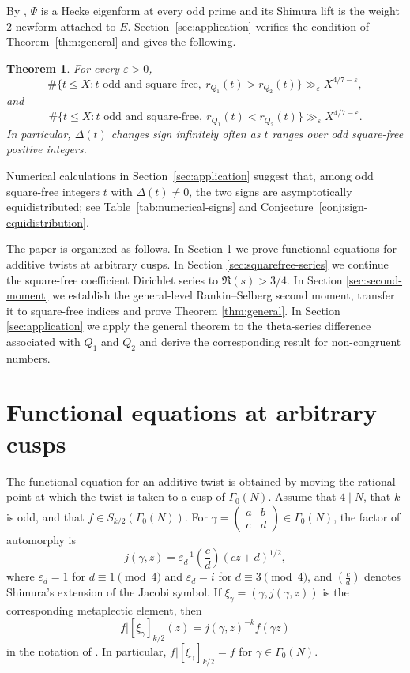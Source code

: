 \documentclass[10pt,a4paper]{amsart}
\newtheorem{theorem}{Theorem}[section]
\begin{document}
By \cite{Qin}, $\Psi$ is a Hecke eigenform at every odd prime and its
Shimura lift is the weight $2$ newform attached to $E$.
Section~\ref{sec:application} verifies the condition of Theorem~\ref{thm:general} and gives the following.

\begin{theorem}\label{thm:quadratic}
For every $\varepsilon>0$,
\[
\#\{t\le X:t\text{ odd and square-free},\ r_{Q_1}(t)>r_{Q_2}(t)\}
\gg_\varepsilon X^{4/7-\varepsilon},
\]
and
\[
\#\{t\le X:t\text{ odd and square-free},\ r_{Q_1}(t)<r_{Q_2}(t)\}
\gg_\varepsilon X^{4/7-\varepsilon}.
\]
In particular, $\Delta(t)$ changes sign infinitely often as $t$ ranges over
odd square-free positive integers.
\end{theorem}

Numerical calculations in Section~\ref{sec:application} suggest that,
among odd square-free integers $t$ with $\Delta(t)\ne0$, the two signs are
asymptotically equidistributed; see Table~\ref{tab:numerical-signs} and
Conjecture~\ref{conj:sign-equidistribution}.

The paper is organized as follows. In Section \ref{sec:functional} we prove functional equations for additive twists at arbitrary cusps. In Section \ref{sec:squarefree-series} we continue the square-free coefficient Dirichlet series to $\Re(s)>3/4$. In Section \ref{sec:second-moment} we establish the general-level Rankin--Selberg second moment, transfer it to square-free indices and prove Theorem \ref{thm:general}. In Section \ref{sec:application} we apply the general theorem to the theta-series difference associated with $Q_1$ and $Q_2$ and derive the corresponding result for non-congruent numbers.

\section{Functional equations at arbitrary cusps}\label{sec:functional}
The functional equation for an additive twist is obtained by moving the
rational point at which the twist is taken to a cusp of $\Gamma_0(N)$.
 Assume that
$4\mid N$, that $k$ is odd, and that $f\in S_{k/2}(\Gamma_0(N))$. For
$\gamma=\begin{pmatrix}a&b\\c&d\end{pmatrix}\in\Gamma_0(N)$, the factor of
automorphy is
\[
j(\gamma,z)=\varepsilon_d^{-1}\left(\frac cd\right)(cz+d)^{1/2},
\]
where $\varepsilon_d=1$ for $d\equiv1\pmod4$ and $\varepsilon_d=i$ for
$d\equiv3\pmod4$, and $\left(\frac cd\right)$ denotes Shimura's extension
of the Jacobi symbol. If $\xi_\gamma=(\gamma,j(\gamma,z))$ is the
corresponding metaplectic element, then
\[
f|[\xi_\gamma]_{k/2}(z)=j(\gamma,z)^{-k}f(\gamma z)
\]
in the notation of \cite{Shimura}. In particular,
$f|[\xi_\gamma]_{k/2}=f$ for $\gamma\in\Gamma_0(N)$.
\end{document}
